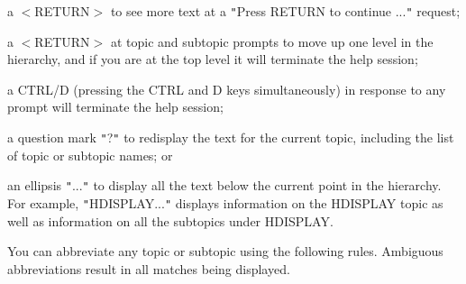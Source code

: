 \documentclass[twoside,11pt,nolof]{starlink}
\begin{document}
{{{         \sstitem
            a $<$RETURN$>$ to see more text at a \texttt{"}Press RETURN to continue ...\texttt{"}
               request;

         \sstitem
            a $<$RETURN$>$ at topic and subtopic prompts to move up one level
               in the hierarchy, and if you are at the top level it will
               terminate the help session;

         \sstitem
            a CTRL/D (pressing the CTRL and D keys simultaneously) in
               response to any prompt will terminate the help session;

         \sstitem
            a question mark \texttt{"}?\texttt{"} to redisplay the text for the current
               topic, including the list of topic or subtopic names; or

         \sstitem
            an ellipsis \texttt{"}...\texttt{"} to display all the text below the
               current point in the hierarchy.  For example, \texttt{"}HDISPLAY...\texttt{"}
               displays information on the HDISPLAY topic as well as
               information on all the subtopics under HDISPLAY.

      }
      You can abbreviate any topic or subtopic using the following
      rules.
      Ambiguous abbreviations result in all matches being displayed.
   }
}
\end{document}
